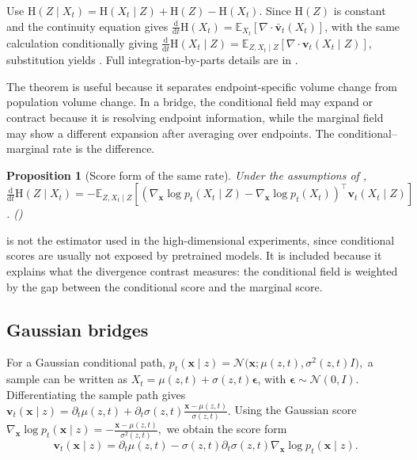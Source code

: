 \documentclass{article}
\newcommand{\E}{\mathbb{E}}
\newcommand{\Ent}{\mathrm{H}}
\newcommand{\dd}{\mathrm{d}}
\newcommand{\vx}{\bm{x}}
\newcommand{\vv}{\bm{v}}
\newcommand{\veps}{\bm{\epsilon}}
\newcommand{\diver}{\nabla\!\cdot}
\newcommand{\inlineeqtag}[1]{\refstepcounter{equation}\label{#1}\nobreak\hfill\textup{(\theequation)}\par}
\theoremstyle{plain}
\newtheorem{proposition}{Proposition}
\theoremstyle{definition}
\theoremstyle{remark}
\begin{document}
Use \(\Ent(Z\mid X_t)=\Ent(X_t\mid Z)+\Ent(Z)-\Ent(X_t)\). Since \(\Ent(Z)\) is constant and the continuity equation gives \(\frac{\dd}{\dd t}\Ent(X_t)=\E_{X_t}[\diver\bar{\vv}_t(X_t)]\), with the same calculation conditionally giving \(\frac{\dd}{\dd t}\Ent(X_t\mid Z)=\E_{Z,X_t\mid Z}[\diver\vv_t(X_t\mid Z)]\), substitution yields . Full integration-by-parts details are in .

The theorem is useful because it separates endpoint-specific volume change from population volume change. In a bridge, the conditional field may expand or contract because it is resolving endpoint information, while the marginal field may show a different expansion after averaging over endpoints. The conditional--marginal rate is the difference.


\begin{proposition}[Score form of the same rate]
\label{prop:score_form}
Under the assumptions of , \\ \(\displaystyle \frac{\dd}{\dd t}\Ent(Z\mid X_t)=-\E_{Z,X_t\mid Z}[(\nabla_{\vx}\log p_t(X_t\mid Z)-\nabla_{\vx}\log p_t(X_t))^\top\vv_t(X_t\mid Z)]\). \inlineeqtag{eq:score_form}
\end{proposition}

 is not the estimator used in the high-dimensional experiments, since conditional scores are usually not exposed by pretrained models. It is included because it explains what the divergence contrast measures: the conditional field is weighted by the gap between the conditional score and the marginal score.

\subsection{Gaussian bridges}
\label{sec:gaussian}

For a Gaussian conditional path,
$
  p_t(\vx\mid z)=\mathcal{N}\big(\vx;\mu(z,t),\sigma^2(z,t)I\big),
$
a sample can be written as $X_t=\mu(z,t)+\sigma(z,t)\veps$, with $\veps\sim \mathcal{N}(0,I)$. Differentiating the sample path gives
$
  \vv_t(\vx\mid z)
  =
  \partial_t \mu(z,t)
  +
  \partial_t \sigma(z,t)\frac{\vx-\mu(z,t)}{\sigma(z,t)}.
$
Using the Gaussian score
$
  \nabla_{\vx}\log p_t(\vx\mid z)
  =
  -\frac{\vx-\mu(z,t)}{\sigma^2(z,t)},
$
we obtain the score form
\begin{equation}
  \vv_t(\vx\mid z)
  =
  \partial_t\mu(z,t)
  -
  \sigma(z,t)\partial_t\sigma(z,t)\nabla_{\vx}\log p_t(\vx\mid z).
  \label{eq:gaussian_velocity_score}
\end{equation}
\end{document}
